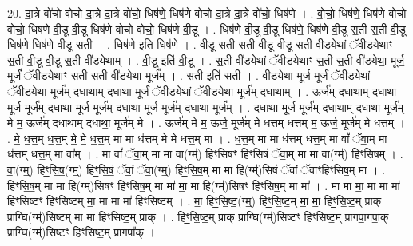 \documentclass[17pt]{extarticle}
\begin{document}
20. दा॒त्रे वो॑चो वोचो दा॒त्रे दा॒त्रे वो॑चो॒ धिष॑णे॒ धिष॑णे वोचो दा॒त्रे दा॒त्रे वो॑चो॒ धिष॑णे । . वो॒चो॒ धिष॑णे॒ धिष॑णे वोचो वोचो॒ धिष॑णे वी॒डू वी॒डू धिष॑णे वोचो वोचो॒ धिष॑णे वी॒डू । . धिष॑णे वी॒डू वी॒डू धिष॑णे॒ धिष॑णे वी॒डू स॒ती स॒ती वी॒डू धिष॑णे॒ धिष॑णे वी॒डू स॒ती । . धिष॑णे॒ इति॒ धिष॑णे । . वी॒डू स॒ती स॒ती वी॒डू वी॒डू स॒ती वी॑डयेथां ॅवीडयेथाꣳ स॒ती वी॒डू वी॒डू स॒ती वी॑डयेथाम् । . वी॒डू इति॑ वी॒डू । . स॒ती वी॑डयेथां ॅवीडयेथाꣳ स॒ती स॒ती वी॑डयेथा॒ मूर्ज॒ मूर्जं॑ ॅवीडयेथाꣳ स॒ती स॒ती वी॑डयेथा॒ मूर्ज᳚म् । . स॒ती इति॑ स॒ती । . वी॒ड॒ये॒था॒ मूर्ज॒ मूर्जं॑ ॅवीडयेथां ॅवीडयेथा॒ मूर्ज॑म् दधाथाम् दधाथा॒ मूर्जं॑ ॅवीडयेथां ॅवीडयेथा॒ मूर्ज॑म् दधाथाम् । . ऊर्ज॑म् दधाथाम् दधाथा॒ मूर्ज॒ मूर्ज॑म् दधाथा॒ मूर्ज॒ मूर्ज॑म् दधाथा॒ मूर्ज॒ मूर्ज॑म् दधाथा॒ मूर्ज᳚म् । . द॒धा॒था॒ मूर्ज॒ मूर्ज॑म् दधाथाम् दधाथा॒ मूर्ज॑म् मे म॒ ऊर्ज॑म् दधाथाम् दधाथा॒ मूर्ज॑म् मे । . ऊर्ज॑म् मे म॒ ऊर्ज॒ मूर्ज॑म् मे धत्तम् धत्तम् म॒ ऊर्ज॒ मूर्ज॑म् मे धत्तम् । . मे॒ ध॒त्त॒म् ध॒त्त॒म् मे॒ मे॒ ध॒त्त॒म् मा मा ध॑त्तम् मे मे धत्त॒म् मा । . ध॒त्त॒म् मा मा ध॑त्तम् धत्त॒म् मा वां᳚ ॅवा॒म् मा ध॑त्तम् धत्त॒म् मा वा᳚म् । . मा वां᳚ ॅवा॒म् मा मा वा(ग्म्॑) हिꣳसिषꣳ हिꣳसिषं ॅवा॒म् मा मा वा(ग्म्॑) हिꣳसिषम् । . वा॒(ग्म्॒) हिꣳ॒॒सि॒ष॒(ग्म्॒) हिꣳ॒॒सि॒षं॒ ॅवां॒ ॅवा॒(ग्म्॒) हिꣳ॒॒सि॒ष॒म् मा मा हि(ग्म्॑)सिषं ॅवां ॅवाꣳहिꣳसिष॒म् मा । . हिꣳ॒॒सि॒ष॒म् मा मा हि(ग्म्॑)सिषꣳ हिꣳसिष॒म् मा मा॑ मा॒ मा हि(ग्म्॑)सिषꣳ हिꣳसिष॒म् मा मा᳚ । . मा मा॑ मा॒ मा मा मा॑ हिꣳसिष्टꣳ हिꣳसिष्टम् मा॒ मा मा मा॑ हिꣳसिष्टम् । . मा॒ हिꣳ॒॒सि॒ष्ट॒(ग्म्॒) हिꣳ॒॒सि॒ष्ट॒म् मा॒ मा॒ हिꣳ॒॒सि॒ष्ट॒म् प्राक् प्राग्घि(ग्म्॑)सिष्टम् मा मा हिꣳसिष्ट॒म् प्राक् । . हिꣳ॒॒सि॒ष्ट॒म् प्राक् प्राग्घि(ग्म्॑)सिष्टꣳ हिꣳसिष्ट॒म् प्रागपा॒गपा॒क् प्राग्घि(ग्म्॑)सिष्टꣳ हिꣳसिष्ट॒म् प्रागपा᳚क् । \newline
\end{document}
